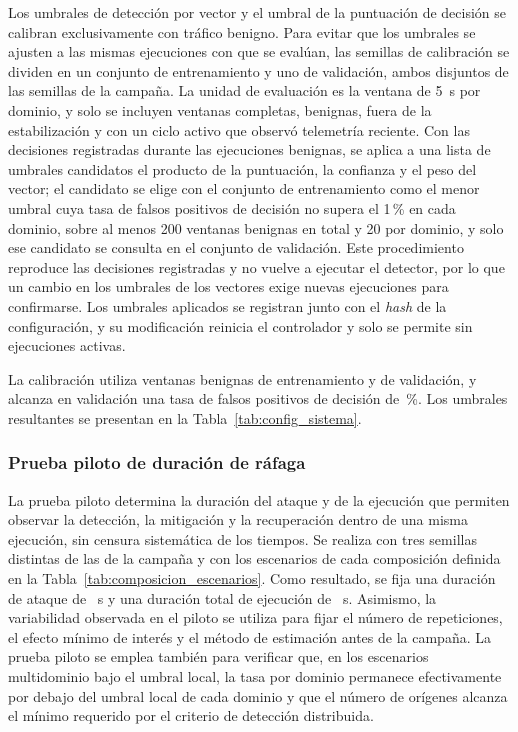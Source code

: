 Los umbrales de detección por vector y el umbral de la puntuación de decisión se calibran exclusivamente con tráfico benigno. Para evitar que los umbrales se ajusten a las mismas ejecuciones con que se evalúan, las semillas de calibración se dividen en un conjunto de entrenamiento y uno de validación, ambos disjuntos de las semillas de la campaña. La unidad de evaluación es la ventana de 5~s por dominio, y solo se incluyen ventanas completas, benignas, fuera de la estabilización y con un ciclo activo que observó telemetría reciente. Con las decisiones registradas durante las ejecuciones benignas, se aplica a una lista de umbrales candidatos el producto de la puntuación, la confianza y el peso del vector; el candidato se elige con el conjunto de entrenamiento como el menor umbral cuya tasa de falsos positivos de decisión no supera el 1\,\% en cada dominio, sobre al menos 200 ventanas benignas en total y 20 por dominio, y solo ese candidato se consulta en el conjunto de validación. Este procedimiento reproduce las decisiones registradas y no vuelve a ejecutar el detector, por lo que un cambio en los umbrales de los vectores exige nuevas ejecuciones para confirmarse. Los umbrales aplicados se registran junto con el \textit{hash} de la configuración, y su modificación reinicia el controlador y solo se permite sin ejecuciones activas.

La calibración utiliza \CalibVentanasEnt{} ventanas benignas de entrenamiento y \CalibVentanasVal{} de validación, y alcanza en validación una tasa de falsos positivos de decisión de \CalibFPRVal\,\%. Los umbrales resultantes se presentan en la Tabla~\ref{tab:config_sistema}.

\subsubsection{Prueba piloto de duración de ráfaga}

La prueba piloto determina la duración del ataque y de la ejecución que permiten observar la detección, la mitigación y la recuperación dentro de una misma ejecución, sin censura sistemática de los tiempos. Se realiza con tres semillas distintas de las de la campaña y con los escenarios de cada composición definida en la Tabla~\ref{tab:composicion_escenarios}. Como resultado, se fija una duración de ataque de \DuracionAtaque~s y una duración total de ejecución de \DuracionEjecucion~s. Asimismo, la variabilidad observada en el piloto se utiliza para fijar el número de repeticiones, el efecto mínimo de interés y el método de estimación antes de la campaña. La prueba piloto se emplea también para verificar que, en los escenarios multidominio bajo el umbral local, la tasa por dominio permanece efectivamente por debajo del umbral local de cada dominio y que el número de orígenes alcanza el mínimo requerido por el criterio de detección distribuida.

